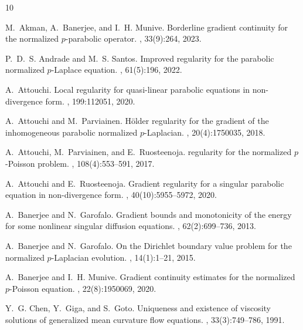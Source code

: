 \documentclass[a4paper,11pt]{amsart}
\theoremstyle{plain}
\theoremstyle{definition}
\numberwithin{equation}{section}
\begin{document}
\begin{thebibliography}{10}
	
	M.~Akman, A.~Banerjee, and I.~H. Munive.
	\newblock Borderline gradient continuity for the normalized {$p$}-parabolic
	operator.
	, 33(9):264, 2023.
	
	P.~D.~S. Andrade and M.~S. Santos.
	\newblock Improved regularity for the parabolic normalized {$p$}-{L}aplace
	equation.
	, 61(5):196, 2022.
	
	A.~Attouchi.
	\newblock Local regularity for quasi-linear parabolic equations in
	non-divergence form.
	, 199:112051, 2020.
	
	A.~Attouchi and M.~Parviainen.
	\newblock H\"older regularity for the gradient of the inhomogeneous parabolic
	normalized {$p$}-{L}aplacian.
	, 20(4):1750035, 2018.
	
	A.~Attouchi, M.~Parviainen, and E.~Ruosteenoja.
	 regularity for the normalized {$p$}-{P}oisson
	problem.
	, 108(4):553--591, 2017.
	
	A.~Attouchi and E.~Ruosteenoja.
	\newblock Gradient regularity for a singular parabolic equation in
	non-divergence form.
	, 40(10):5955--5972, 2020.
	
	A.~Banerjee and N.~Garofalo.
	\newblock Gradient bounds and monotonicity of the energy for some nonlinear
	singular diffusion equations.
	, 62(2):699--736, 2013.
	
	A.~Banerjee and N.~Garofalo.
	\newblock On the {D}irichlet boundary value problem for the normalized
	{$p$}-{L}aplacian evolution.
	, 14(1):1--21, 2015.
	
	A.~Banerjee and I.~H. Munive.
	\newblock Gradient continuity estimates for the normalized {$p$}-{P}oisson
	equation.
	, 22(8):1950069, 2020.
	
	Y.~G. Chen, Y.~Giga, and S.~Goto.
	\newblock Uniqueness and existence of viscosity solutions of generalized mean
	curvature flow equations.
	, 33(3):749--786, 1991.
	

\end{thebibliography}
\end{document}
